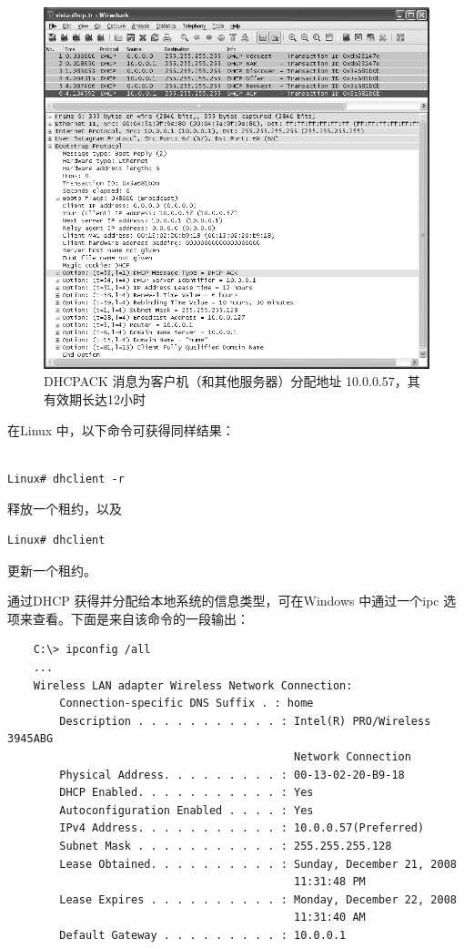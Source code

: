 \begin{figure}
  \centering
  \includegraphics[scale=0.6]{imgs/6/6-9.png}
  \caption{DHCPACK 消息为客户机（和其他服务器）分配地址 10.0.0.57，其有效期长达12小时}
\end{figure}

在Linux 中，以下命令可获得同样结果：

\begin{verbatim}

Linux# dhclient -r
\end{verbatim}

释放一个租约，以及
\begin{verbatim}
Linux# dhclient
\end{verbatim}

更新一个租约。

通过DHCP 获得并分配给本地系统的信息类型，可在Windows 中通过一个ipc
选项来查看。下面是来自该命令的一段输出：

\begin{verbatim}
    C:\> ipconfig /all
    ...
    Wireless LAN adapter Wireless Network Connection:
        Connection-specific DNS Suffix . : home
        Description . . . . . . . . . . . : Intel(R) PRO/Wireless 3945ABG
                                            Network Connection
        Physical Address. . . . . . . . . : 00-13-02-20-B9-18
        DHCP Enabled. . . . . . . . . . . : Yes
        Autoconfiguration Enabled . . . . : Yes
        IPv4 Address. . . . . . . . . . . : 10.0.0.57(Preferred)
        Subnet Mask . . . . . . . . . . . : 255.255.255.128
        Lease Obtained. . . . . . . . . . : Sunday, December 21, 2008
                                            11:31:48 PM
        Lease Expires . . . . . . . . . . : Monday, December 22, 2008
                                            11:31:40 AM
        Default Gateway . . . . . . . . . : 10.0.0.1
\end{verbatim}

